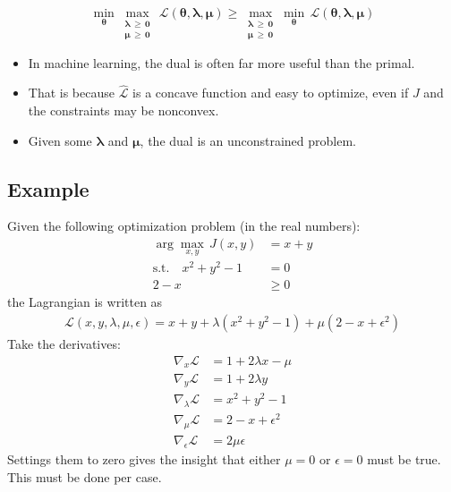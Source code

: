 \documentclass[a4paper, 11pt, accentcolor = tud3b]{tudreport}
\renewcommand{\vec}[1]{\mathbf{#1}}
\begin{document}
				\begin{equation}
					\min_{\vec{\theta}} \max_{\substack{\vec{\lambda} \,\geq\, \vec{0} \\ \vec{\mu} \,\geq\, \vec{0}}} \, \mathcal{L}(\vec{\theta}, \vec{\lambda}, \vec{\mu}) \geq \max_{\substack{\vec{\lambda} \,\geq\, \vec{0} \\ \vec{\mu} \,\geq\, \vec{0}}} \min_{\vec{\theta}} \, \mathcal{L}(\vec{\theta}, \vec{\lambda}, \vec{\mu})
				\end{equation}
				\begin{itemize}
					\item In machine learning, the dual is often far more useful than the primal.
					\item That is because \(\hat{\mathcal{L}}\) is a concave function and easy to optimize, even if \(J\) and the constraints may be nonconvex.
					\item Given some \(\vec{\lambda}\) and \(\vec{\mu}\), the dual is an unconstrained problem.
				\end{itemize}

			\subsection{Example}
				Given the following optimization problem (in the real numbers):
				\begin{align}
					\arg\max\limits_{x, y} \, J(x, y) &= x + y \\
					\textrm{s.t.} \quad
					x^2 + y^2 - 1 &= 0 \\
					2 - x &\geq 0
				\end{align}
				the Lagrangian is written as
				\begin{align}
					\mathcal{L}(x, y, \lambda, \mu, \epsilon) = x + y + \lambda (x^2 + y^2 - 1) + \mu (2 - x + \epsilon^2)
				\end{align}
				Take the derivatives:
				\begin{align}
					\nabla_x \mathcal{L}       & = 1 + 2 \lambda x - \mu \\
					\nabla_y \mathcal{L}       & = 1 + 2 \lambda y \\
					\nabla_\lambda \mathcal{L} & = x^2 + y^2 - 1 \\
					\nabla_\mu \mathcal{L}     & = 2 - x + \epsilon^2 \\
					\nabla_\epsilon \mathcal{L} &= 2\mu\epsilon
				\end{align}
				Settings them to zero gives the insight that either \( \mu = 0 \) or \( \epsilon = 0 \) must be true. This must be done per case.
				
\end{document}
